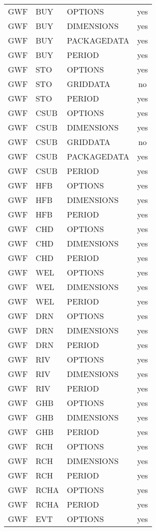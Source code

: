 \begin{longtable}{p{1.5cm} p{1.5cm} p{3cm} c}
\hline
GWF & BUY & OPTIONS & yes \\ 
GWF & BUY & DIMENSIONS & yes \\ 
GWF & BUY & PACKAGEDATA & yes \\ 
GWF & BUY & PERIOD & yes \\ 
\hline
GWF & STO & OPTIONS & yes \\ 
GWF & STO & GRIDDATA & no \\ 
GWF & STO & PERIOD & yes \\ 
\hline
GWF & CSUB & OPTIONS & yes \\ 
GWF & CSUB & DIMENSIONS & yes \\ 
GWF & CSUB & GRIDDATA & no \\ 
GWF & CSUB & PACKAGEDATA & yes \\ 
GWF & CSUB & PERIOD & yes \\ 
\hline
GWF & HFB & OPTIONS & yes \\ 
GWF & HFB & DIMENSIONS & yes \\ 
GWF & HFB & PERIOD & yes \\ 
\hline
GWF & CHD & OPTIONS & yes \\ 
GWF & CHD & DIMENSIONS & yes \\ 
GWF & CHD & PERIOD & yes \\ 
\hline
GWF & WEL & OPTIONS & yes \\ 
GWF & WEL & DIMENSIONS & yes \\ 
GWF & WEL & PERIOD & yes \\ 
\hline
GWF & DRN & OPTIONS & yes \\ 
GWF & DRN & DIMENSIONS & yes \\ 
GWF & DRN & PERIOD & yes \\ 
\hline
GWF & RIV & OPTIONS & yes \\ 
GWF & RIV & DIMENSIONS & yes \\ 
GWF & RIV & PERIOD & yes \\ 
\hline
GWF & GHB & OPTIONS & yes \\ 
GWF & GHB & DIMENSIONS & yes \\ 
GWF & GHB & PERIOD & yes \\ 
\hline
GWF & RCH & OPTIONS & yes \\ 
GWF & RCH & DIMENSIONS & yes \\ 
GWF & RCH & PERIOD & yes \\ 
\hline
GWF & RCHA & OPTIONS & yes \\ 
GWF & RCHA & PERIOD & yes \\ 
\hline
GWF & EVT & OPTIONS & yes \\ 

\end{longtable}
